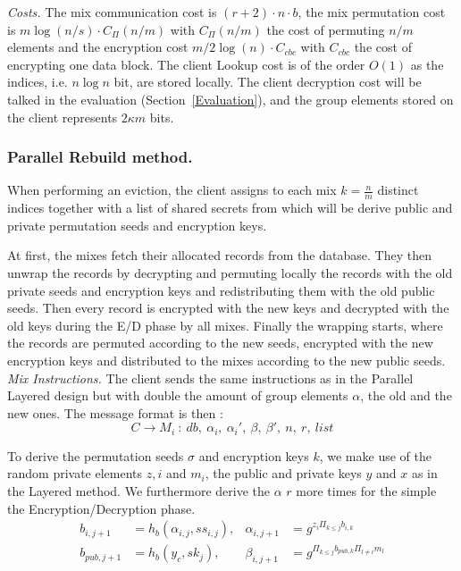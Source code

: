 \documentclass{llncs}
\begin{document}
\noindent\textit{Costs.} The mix communication cost is $ (r+2) \cdot n \cdot b$, the mix permutation cost is $m \log(n/s) \cdot C_{\Pi}(n/m)$ with $C_{\Pi}(n/m)$ the cost of permuting $n/m$ elements and the encryption cost $m/2 \log(n)\cdot  C_{cbc}$ with $C_{cbc}$ the cost of encrypting one data block. The client Lookup cost is of the order $O(1)$ as the indices, i.e. $n\log n$ bit, are stored locally. The client decryption cost will be talked in the evaluation (Section~\ref{Evaluation}), and the group elements stored on the client represents $2\kappa m$ bits.

\subsubsection{Parallel Rebuild method.}
When performing an eviction, the client assigns to each mix $k=\frac{n}{m}$ distinct indices together with a list of shared secrets from which will be derive public and private permutation seeds and encryption keys.

At first, the mixes fetch their allocated records from the database. They then unwrap the records by decrypting and permuting locally the records with the old private seeds and encryption keys and redistributing them with the old public seeds. Then every record is encrypted with the new keys and decrypted with the old keys during the E/D phase by all mixes. Finally the wrapping starts, where the records are permuted according to the new seeds, encrypted with the new encryption keys and distributed to the mixes according to the new public seeds.\\

\noindent\textit{Mix Instructions.}
The client sends the same instructions as in the Parallel Layered design but with double the amount of group elements $\alpha$, the old and the new ones. The message format is then : 
$$C \rightarrow M_i\ :\ db,\  \alpha_i,\ \alpha_i',\ \beta,\ \beta',\ n,\ r,\ list$$

To derive the permutation seeds $\sigma$ and encryption keys $k$, we make use of the random private elements $z,i$ and $m_i$, the public and private keys $y$ and $x$ as in the Layered method. We furthermore derive the $\alpha$ $r$ more times for the simple the Encryption/Decryption phase. 
\begin{align*}
b_{i,j+1}&=h_b(\alpha_{i,j}, ss_{i,j}), & \alpha_{i,j+1} &= g^{z_i\Pi_{k\leq j}b_{i,k}}\\
b_{pub,j+1}&=h_b(y_c, sk_{j}), &\beta_{i, j+1} &= g^{\Pi_{k\leq j}b_{pub,k}\Pi_{l\neq i}m_l}\\
\end{align*}
\end{document}
